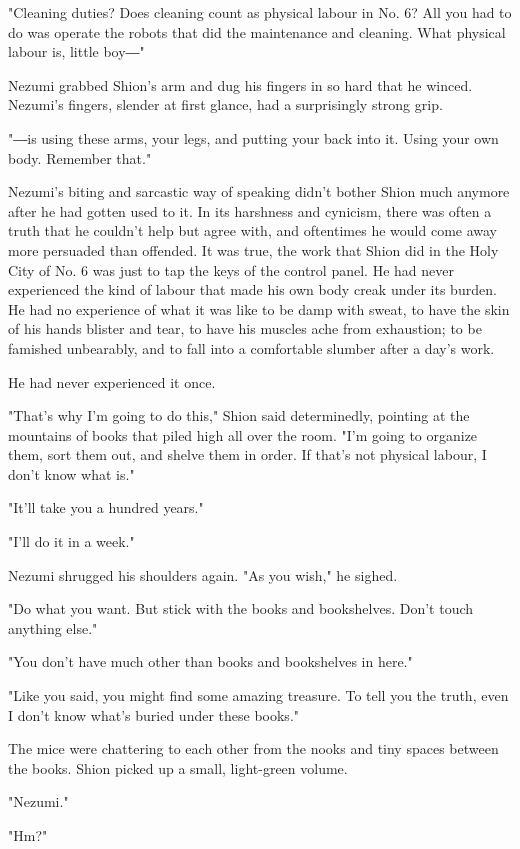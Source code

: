 "Cleaning duties? Does cleaning count as physical labour in No. 6? All
you had to do was operate the robots that did the maintenance and
cleaning. What physical labour is, little boy―"

Nezumi grabbed Shion's arm and dug his fingers in so hard that he
winced. Nezumi's fingers, slender at first glance, had a surprisingly
strong grip.

"―is using these arms, your legs, and putting your back into it. Using
your own body. Remember that."

Nezumi's biting and sarcastic way of speaking didn't bother Shion much
anymore after he had gotten used to it. In its harshness and cynicism,
there was often a truth that he couldn't help but agree with, and
oftentimes he would come away more persuaded than offended. It was true,
the work that Shion did in the Holy City of No. 6 was just to tap the
keys of the control panel. He had never experienced the kind of labour
that made his own body creak under its burden. He had no experience of
what it was like to be damp with sweat, to have the skin of his hands
blister and tear, to have his muscles ache from exhaustion; to be
famished unbearably, and to fall into a comfortable slumber after a
day's work.

He had never experienced it once.

"That's why I'm going to do this," Shion said determinedly, pointing at
the mountains of books that piled high all over the room. "I'm going to
organize them, sort them out, and shelve them in order. If that's not
physical labour, I don't know what is."

"It'll take you a hundred years."

"I'll do it in a week."

Nezumi shrugged his shoulders again. "As you wish," he sighed.

"Do what you want. But stick with the books and bookshelves. Don't touch
anything else."

"You don't have much other than books and bookshelves in here."

"Like you said, you might find some amazing treasure. To tell you the
truth, even I don't know what's buried under these books."

The mice were chattering to each other from the nooks and tiny spaces
between the books. Shion picked up a small, light-green volume.

"Nezumi."

"Hm?"

